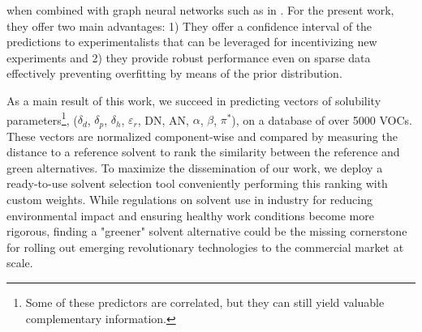 \documentclass[
  english,        %
  font=times,     %
  onecolumn,      %
]{article}
\begin{document}
when combined with graph neural networks such as in \cite{kouroudis2025augur}. For the present work, they offer two main advantages: 1) They offer a confidence interval of the predictions to experimentalists that can be leveraged for incentivizing new experiments and 2) they provide robust performance even on sparse data effectively preventing overfitting by means of the prior distribution.

As a main result of this work, we succeed in predicting vectors of solubility parameters\footnote{Some of these predictors are correlated, but they can still yield valuable complementary information.}, ($\delta_d$, $\delta_p$, $\delta_h$, $\varepsilon_r$, DN, AN, $\alpha$, $\beta$, $\pi^*$), on a database of over 5000 VOCs\cite{CompsolDatabaseRevised2024}. These vectors are normalized component-wise and compared by measuring the distance to a reference solvent to rank the similarity between the reference and green alternatives. To maximize the dissemination of our work, we deploy a ready-to-use solvent selection tool conveniently performing this ranking with custom weights. While regulations on solvent use in industry for reducing environmental impact and ensuring healthy work conditions become more rigorous, finding a "greener" solvent alternative could be the missing cornerstone for rolling out emerging revolutionary technologies to the commercial market at scale.



\end{document}
